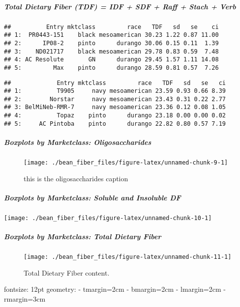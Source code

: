 \documentclass[12pt,]{article}
\begin{document}
\subparagraph{Total Dietary Fiber (TDF) = IDF + SDF + Raff + Stach +
Verb}\label{total-dietary-fiber-tdf-idf-sdf-raff-stach-verb}

\begin{verbatim}
##          Entry mktclass         race   TDF   sd   se    ci
## 1:  PR0443-151    black mesoamerican 30.23 1.22 0.87 11.00
## 2:      IP08-2    pinto      durango 30.06 0.15 0.11  1.39
## 3:    ND021717    black mesoamerican 29.78 0.83 0.59  7.48
## 4: AC Resolute       GN      durango 29.45 1.57 1.11 14.08
## 5:         Max    pinto      durango 28.59 0.81 0.57  7.26
\end{verbatim}

\begin{verbatim}
##             Entry mktclass         race   TDF   sd   se   ci
## 1:          T9905     navy mesoamerican 23.59 0.93 0.66 8.39
## 2:        Norstar     navy mesoamerican 23.43 0.31 0.22 2.77
## 3: BelMiNeb-RMR-7     navy mesoamerican 23.36 0.12 0.08 1.05
## 4:          Topaz    pinto      durango 23.18 0.00 0.00 0.02
## 5:     AC Pintoba    pinto      durango 22.82 0.80 0.57 7.19
\end{verbatim}

\subparagraph{Boxplots by Marketclass:
Oligosaccharides}\label{boxplots-by-marketclass-oligosaccharides}

\begin{figure}

\texttt{[image: ./bean\_fiber\_files/figure-latex/unnamed-chunk-9-1]} \hfill{}

\caption{this is the oligosaccharides caption}\label{fig:unnamed-chunk-9}
\end{figure}

\subparagraph{Boxplots by Marketclass: Soluble and Insoluble
DF}\label{boxplots-by-marketclass-soluble-and-insoluble-df}

\begin{center}\texttt{[image: ./bean\_fiber\_files/figure-latex/unnamed-chunk-10-1]} \end{center}

\subparagraph{Boxplots by Marketclass: Total Dietary
Fiber}\label{boxplots-by-marketclass-total-dietary-fiber}

\begin{figure}

\texttt{[image: ./bean\_fiber\_files/figure-latex/unnamed-chunk-11-1]} \hfill{}

\caption{Total Dietary Fiber content.}\label{fig:unnamed-chunk-11}
\end{figure}

fontsize: 12pt geometry: - tmargin=2cm - bmargin=2cm - lmargin=2cm -
rmargin=3cm
\end{document}
